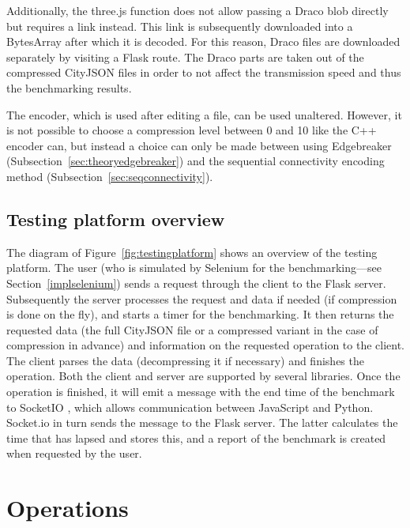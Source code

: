 Additionally, the three.js function does not allow passing a Draco \ac{blob} directly but requires a link instead.
This link is subsequently downloaded into a BytesArray after which it is decoded. 
For this reason, Draco files are downloaded separately by visiting a Flask route.
The Draco parts are taken out of the compressed CityJSON files in order to not affect the transmission speed and thus the benchmarking results.

The encoder, which is used after editing a file, can be used unaltered.
However, it is not possible to choose a compression level between 0 and 10 like the C++ encoder can, but instead a choice can only be made between using Edgebreaker (Subsection~\ref{sec:theoryedgebreaker}) and the sequential connectivity encoding method (Subsection~\ref{sec:seqconnectivity}).

\subsection{Testing platform overview}
\label{sec:testingplatformoverview}
The diagram of Figure~\ref{fig:testingplatform} shows an overview of the testing platform.
The user (who is simulated by Selenium for the benchmarking---see Section~\ref{implselenium}) sends a request through the client to the Flask server.
Subsequently the server processes the request and data if needed (if compression is done on the fly), and starts a timer for the benchmarking.
It then returns the requested data (the full CityJSON file or a compressed variant in the case of compression in advance) and information on the requested operation to the client.
The client parses the data (decompressing it if necessary) and finishes the operation.
Both the client and server are supported by several libraries.
Once the operation is finished, it will emit a message with the end time of the benchmark to SocketIO \citep{Socket.io2020}, which allows communication between JavaScript and Python.
Socket.io in turn sends the message to the Flask server.
The latter calculates the time that has lapsed and stores this, and a report of the benchmark is created when requested by the user.



\section{Operations}
\label{sec:operations}

